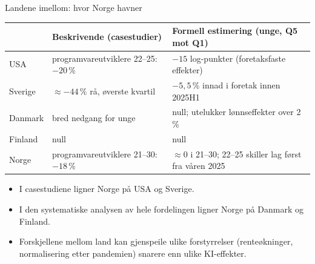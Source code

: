 
\begin{frame}{Landene imellom: hvor Norge havner}
\footnotesize
\setlength{\tabcolsep}{5pt}
\begin{tabular}{l p{5.2cm} p{5.6cm}}
\toprule
 & Beskrivende (casestudier) & Formell estimering (unge, Q5 mot Q1) \\
\midrule
USA     & programvareutviklere 22--25: $-20\,\%$ & $-15$ log-punkter (foretaksfaste effekter) \\
Sverige & $\approx -44\,\%$ rå, øverste kvartil  & $-5{,}5\,\%$ innad i foretak innen 2025H1 \\
Danmark & bred nedgang for unge                  & null; utelukker lønnseffekter over 2\,\% \\
Finland & null                                   & null \\
\midrule
Norge   & programvareutviklere 21--30: $-18\,\%$ & $\approx 0$ i 21--30; 22--25 skiller lag først fra våren 2025 \\
\bottomrule
\end{tabular}

\vspace{0.8em}
\begin{itemize}\setlength{\itemsep}{4pt}
  \item I casestudiene ligner Norge på USA og Sverige.
  \item I den systematiske analysen av hele fordelingen ligner Norge på Danmark og Finland.
  \item Forskjellene mellom land kan gjenspeile ulike forstyrrelser (renteøkninger, normalisering etter pandemien) snarere enn ulike KI-effekter.
\end{itemize}
\end{frame}
